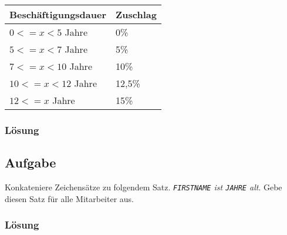\begin{table}[H]
  \ttfamily
  \centering
  \begin{tabular}{l|l}
    \textbf{Beschäftigungsdauer} & \textbf{Zuschlag} \\
    \hline\hline
    $0<=x<5$ Jahre & 0\% \\
    $5<=x<7$ Jahre & 5\% \\
    $7<=x<10$ Jahre & 10\% \\
    $10<=x<12$ Jahre & 12,5\% \\
    $12<=x$ Jahre & 15\% \\
  \end{tabular}
  \label{tbl:uebung_03.aufgabe_12}
\end{table}

\subsubsection*{Lösung}
\label{sec:uebung_03.aufgabe_12.loesung}

\subsection{Aufgabe}
\label{sec:uebung_03.aufgabe_13}
Konkateniere Zeichensätze zu folgendem Satz. \textit{\texttt{FIRSTNAME} ist \texttt{JAHRE} alt}. Gebe diesen Satz für alle Mitarbeiter aus.

\subsubsection*{Lösung}
\label{sec:uebung_03.aufgabe_13.loesung}
